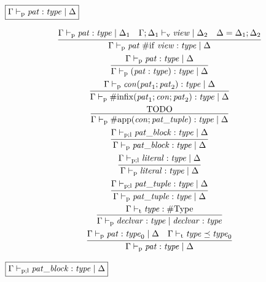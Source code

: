 $\fbox{$\Gamma \vdash_\mathrm{p} \mathit{pat}: \mathit{type} \mid \Delta$}$

\begin{gather*}
    \infer{\Gamma \vdash_\mathrm{p} \mathit{pat}\; \mathrm{\#if}\; \mathit{view}: \mathit{type} \mid \Delta}{
        \Gamma \vdash_\mathrm{p} \mathit{pat}: \mathit{type} \mid \Delta_1
        &
        \Gamma; \Delta_1 \vdash_\mathrm{v} \mathit{view} \mid \Delta_2
        &
        \Delta = \Delta_1; \Delta_2
    }
    \\
    \infer{\Gamma \vdash_\mathrm{p} (\mathit{pat}: \mathit{type}): \mathit{type} \mid \Delta}{
        \Gamma \vdash_\mathrm{p} \mathit{pat}: \mathit{type} \mid \Delta
    }
    \\
    \infer{\Gamma \vdash_\mathrm{p} \mathrm{\#infix}(\mathit{pat}_1; \mathit{con}; \mathit{pat}_2): \mathit{type} \mid \Delta}{
        \Gamma \vdash_\mathrm{p} \mathit{con}(\mathit{pat}_1; \mathit{pat}_2): \mathit{type} \mid \Delta
    }
    \\
    \infer{\Gamma \vdash_\mathrm{p} \mathrm{\#app}(\mathit{con}; \mathit{pat\_tuple}): \mathit{type} \mid \Delta}{
        \text{TODO}
    }
    \\
    \infer{\Gamma \vdash_\mathrm{p} \mathit{pat\_block}: \mathit{type} \mid \Delta}{
        \Gamma \vdash_{\mathrm{p}; \mathrm{l}} \mathit{pat\_block}: \mathit{type} \mid \Delta
    }
    \\
    \infer{\Gamma \vdash_\mathrm{p} \mathit{literal}: \mathit{type} \mid \Delta}{
        \Gamma \vdash_{\mathrm{p}; \mathrm{l}} \mathit{literal}: \mathit{type} \mid \Delta
    }
    \\
    \infer{\Gamma \vdash_\mathrm{p} \mathit{pat\_tuple}: \mathit{type} \mid \Delta}{
        \Gamma \vdash_{\mathrm{p}; \mathrm{l}} \mathit{pat\_tuple}: \mathit{type} \mid \Delta
    }
    \\
    \infer{\Gamma \vdash_\mathrm{p} \mathit{declvar}: \mathit{type} \mid \mathit{declvar}: \mathit{type}}{
        \Gamma \vdash_\mathrm{t} \mathit{type}: \mathrm{\#Type}
    }
    \\
    \infer{\Gamma \vdash_\mathrm{p} \mathit{pat}: \mathit{type} \mid \Delta}{
        \Gamma \vdash_\mathrm{p} \mathit{pat}: \mathit{type}_0 \mid \Delta
        &
        \Gamma \vdash_\mathrm{t} \mathit{type} \preceq \mathit{type}_0
    }
\end{gather*}

$\fbox{$\Gamma \vdash_{\mathrm{p}; \mathrm{l}} \mathit{pat\_block}: \mathit{type} \mid \Delta$}$

